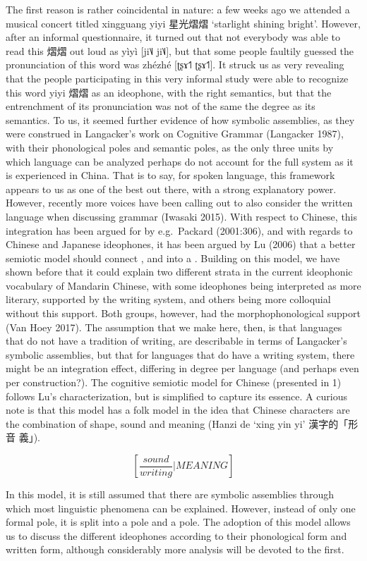 \documentclass[12pt,article,oneside]{memoir}
\theoremstyle{definition}
\theoremstyle{definition}
\theoremstyle{definition}
\theoremstyle{remark}
\begin{document}
The first reason is rather coincidental in nature: a few weeks ago we
attended a musical concert titled xingguang yiyi 星光熠熠 `starlight
shining bright'. However, after an informal questionnaire, it turned out
that not everybody was able to read this 熠熠 out loud as yìyì {[}ji˥˩
ji˥˩{]}, but that some people faultily guessed the pronunciation of this
word was zhézhé {[}ʈʂɤ˦˥ ʈʂɤ˦˥{]}. It struck us as very revealing that
the people participating in this very informal study were able to
recognize this word yiyi 熠熠 as an ideophone, with the right semantics,
but that the entrenchment of its pronunciation was not of the same the
degree as its semantics. To us, it seemed further evidence of how
symbolic assemblies, as they were construed in Langacker's work on
Cognitive Grammar (Langacker 1987), with their phonological poles and
semantic poles, as the only three units by which language can be
analyzed perhaps do not account for the full system as it is experienced
in China. That is to say, for spoken language, this framework appears to
us as one of the best out there, with a strong explanatory power.
However, recently more voices have been calling out to also consider the
written language when discussing grammar (Iwasaki 2015). With respect to
Chinese, this integration has been argued for by e.g.~Packard
(2001:306), and with regards to Chinese and Japanese ideophones, it has
been argued by Lu (2006) that a better semiotic model should connect ,
and into a . Building on this model, we have shown before that it could
explain two different strata in the current ideophonic vocabulary of
Mandarin Chinese, with some ideophones being interpreted as more
literary, supported by the writing system, and others being more
colloquial without this support. Both groups, however, had the
morphophonological support (Van Hoey 2017). The assumption that we make
here, then, is that languages that do not have a tradition of writing,
are describable in terms of Langacker's symbolic assemblies, but that
for languages that do have a writing system, there might be an
integration effect, differing in degree per language (and perhaps even
per construction?). The cognitive semiotic model for Chinese (presented
in 1) follows Lu's characterization, but is simplified to capture its
essence. A curious note is that this model has a folk model in the idea
that Chinese characters are the combination of shape, sound and meaning
(Hanzi de `xing yin yi' 漢字的「形 音 義」).

\[[\frac{sound}{writing}|MEANING]\]

In this model, it is still assumed that there are symbolic assemblies
through which most linguistic phenomena can be explained. However,
instead of only one formal pole, it is split into a pole and a pole. The
adoption of this model allows us to discuss the different ideophones
according to their phonological form and written form, although
considerably more analysis will be devoted to the first.
\end{document}
